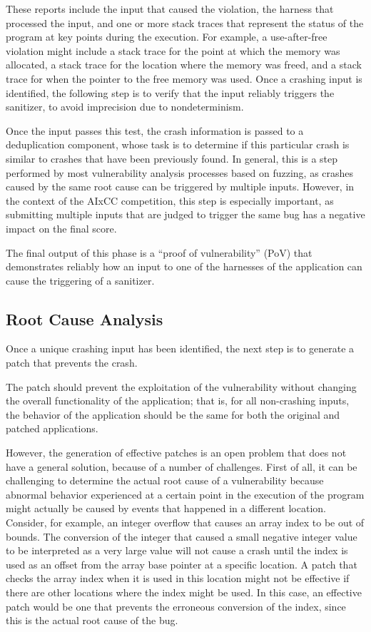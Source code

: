 These reports include the input that caused the violation, the harness that processed the input, and one or more stack traces that represent the status of the program at key points during the execution.
For example, a use-after-free violation might include a stack trace for the point at which the memory was allocated, a stack trace for the location where the memory was freed, and a stack trace for when the pointer to the free memory was used.
Once a crashing input is identified, the following step is to verify that the input reliably triggers the sanitizer, to avoid imprecision due to nondeterminism.

Once the input passes this test, the crash information is passed to a deduplication component, whose task is to determine if this particular crash is similar to crashes that have been previously found.
In general, this is a step performed by most vulnerability analysis processes based on fuzzing, as crashes caused by the same root cause can be triggered by multiple inputs.
However, in the context of the AIxCC competition, this step is especially important, as submitting multiple inputs that are judged to trigger the same bug has a negative impact on the final score.

The final output of this phase is a ``proof of vulnerability'' (PoV) that demonstrates reliably how an input to one of the harnesses of the application can cause the triggering of a sanitizer.

\subsection{Root Cause Analysis}
Once a unique crashing input has been identified, the next step is to generate a patch that prevents the crash.

The patch should prevent the exploitation of the vulnerability without changing the overall functionality of the application; that is, for all non-crashing inputs, the behavior of the application should be the same for both the original and patched applications.

However, the generation of effective patches is an open problem that does not have a general solution, because of a number of challenges.
First of all, it can be challenging to determine the actual root cause of a vulnerability because abnormal behavior experienced at a certain point in the execution of the program might actually be caused by events that happened in a different location.
Consider, for example, an integer overflow that causes an array index to be out of bounds.
The conversion of the integer that caused a small negative integer value to be interpreted as a very large value will not cause a crash until the index is used as an offset from the array base pointer at a specific location.
A patch that checks the array index when it is used in this location might not be effective if there are other locations where the index might be used.
In this case, an effective patch would be one that prevents the erroneous conversion of the index, since this is the actual root cause of the bug.

